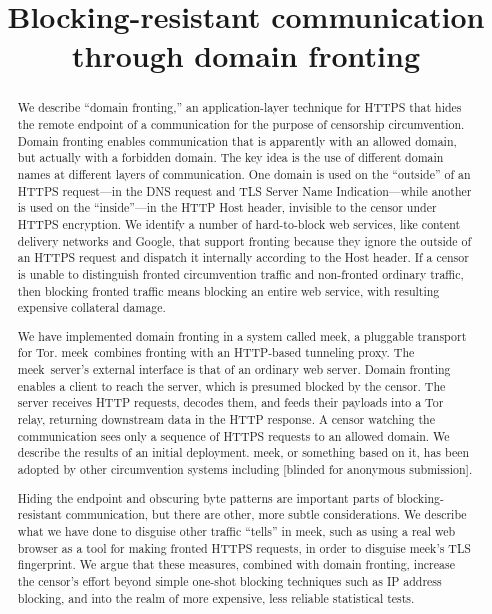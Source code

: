 \documentclass[conference]{IEEEtran}
\newcommand{\meek}{meek\xspace}
\begin{document}
\title{Blocking-resistant communication\\through domain fronting}


\maketitle

\begin{abstract}
We describe ``domain fronting,'' an application-layer technique
for HTTPS
that hides the remote endpoint of a communication
for the purpose of censorship circumvention.
Domain fronting enables communication that is apparently with an allowed domain,
but actually with a forbidden domain.
The key idea is the use of different domain names at different layers of communication.
One domain is used on the ``outside'' of an HTTPS request---in the DNS request and
TLS Server Name Indication---while another is used
on the ``inside''---in the HTTP Host header, invisible to the
censor under HTTPS encryption.
We identify a number of hard-to-block web services,
like content delivery networks and Google,
that support fronting because they ignore the outside of an HTTPS request
and dispatch it internally according to the Host header.
If a censor is unable to distinguish fronted circumvention traffic and non-fronted ordinary traffic,
then blocking fronted traffic means blocking an entire web service,
with resulting expensive collateral damage.

We have implemented domain fronting in a system called \meek,
a pluggable transport for Tor.
\meek\ combines fronting with an HTTP-based tunneling proxy.
The \meek\ server's external interface is that of an ordinary web server.
Domain fronting enables a client to reach the server, which is presumed blocked by the censor.
The server receives HTTP requests, decodes them, and feeds their payloads into a Tor relay,
returning downstream data in the HTTP response.
A censor watching the communication sees only a sequence of HTTPS requests to an allowed domain.
We describe the results of an initial deployment.
\meek, or something based on it,
has been adopted by other circumvention systems including
[blinded for anonymous submission].

Hiding the endpoint and obscuring byte patterns are important parts of blocking-resistant communication,
but there are other, more subtle considerations.
We describe what we have done to disguise other traffic ``tells'' in \meek,
such as using a real web browser as a tool for making fronted HTTPS requests,
in order to disguise meek's TLS fingerprint.
We argue that these measures, combined with domain fronting, increase the censor's effort
beyond simple one-shot blocking techniques such as IP address blocking, and into
the realm of more expensive, less reliable statistical tests.
\end{abstract}
\end{document}
